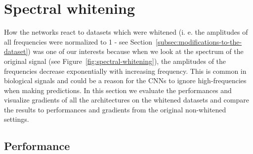 \section{Spectral whitening}\label{sec:spectral-whitening}

How the networks react to datasets which were whitened (i. e. the amplitudes of all frequencies were normalized to 1 - see Section~\ref{subsec:modifications-to-the-dataset}) was one of our interests because when we look at the spectrum of the original signal (see Figure~\ref{fig:spectral-whitening}), the amplitudes of the frequencies decrease exponentially with increasing frequency.
This is common in biological signals and could be a reason for the CNNs to ignore high-frequencies when making predictions.
In this section we evaluate the performances and visualize gradients of all the architectures on the whitened datasets and compare the results to performances and gradients from the original non-whitened settings. 

\subsection{Performance}\label{subsec:pw-performance}

